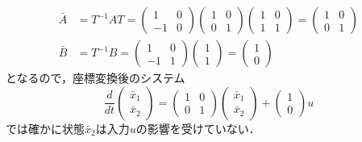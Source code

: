 \begin{align}
 \bar{A} &= T^{-1}AT =
 \left(
 \begin{array}{cc}
  1 & 0 \\
  -1 & 0
 \end{array}
 \right)
 \left(
 \begin{array}{cc}
  1 & 0 \\
  0 & 1
 \end{array}
 \right)
 \left(
 \begin{array}{cc}
  1 & 0 \\
  1 & 1
 \end{array}
 \right) =
 \left(
 \begin{array}{cc}
  1 & 0 \\
  0 & 1
 \end{array}
 \right) \\
 \bar{B} &= T^{-1}B =
 \left(
 \begin{array}{cc}
  1 & 0 \\
  -1 & 1
 \end{array}
 \right)
 \left(
 \begin{array}{c}
  1 \\
  1 
 \end{array}
 \right) =
 \left(
 \begin{array}{c}
  1 \\
  0 
 \end{array}
 \right)
\end{align}
となるので，座標変換後のシステム
\begin{equation}
 \frac{d}{dt}
  \left(
   \begin{array}{c}
    \bar{x}_1 \\
    \bar{x}_2
   \end{array}
  \right) = 
  \left(
   \begin{array}{cc}
    1 & 0 \\
    0 & 1
   \end{array}
  \right)
  \left(
   \begin{array}{c}
    \bar{x}_1 \\
    \bar{x}_2
   \end{array}
  \right) +
  \left(
   \begin{array}{c}
    1 \\
    0
   \end{array}
  \right) u
\end{equation}
では確かに状態$\bar{x}_2$は入力$u$の影響を受けていない．
\\

